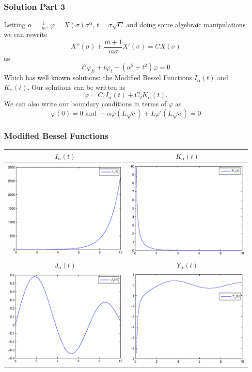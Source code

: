 	
	
	
	\begin{frame}
	\frametitle{Solution Part 3}
		 Letting $\alpha=\frac 1m$, $\varphi=X(\sigma)\sigma ^\alpha$, $t=\sigma \sqrt{C}$ and doing some algebraic manipulations we can rewrite 
		\[X''(\sigma)+\frac{m+1}{m\sigma}X'(\sigma)=C X(\sigma)\]
		as
		\[t^2 \varphi_{tt}+t \varphi_t-(\alpha^2+t^2)\varphi=0\]
		Which has well known solutions: the Modified Bessel Functions $I_\alpha(t)$ and $K_\alpha(t)$. Our solutions can be written as $$\varphi=C_1I_\alpha(t)+C_2K_\alpha(t).$$ We can also write our boundary conditions in terms of $\varphi$ as 
		\[\varphi(0)=0\text{ and }-\alpha\varphi(L\sqrt{c})+L\varphi'(L\sqrt{c})=0\]
	\end{frame}
	
	
	\begin{frame}
		\frametitle{Modified Bessel Functions}
		\centering
		\begin{tabular}{|c|c|}\hline
		$I_\alpha(t)$&$K_\alpha(t)$\\\hline
		\includegraphics[width=.40\textwidth]{Bessel/BesselI.eps}&\includegraphics[width=.40\textwidth]{Bessel/BesselK.eps}\\\hline
		$J_\alpha(t)$&$Y_\alpha(t)$\\\hline
		\includegraphics[width=.40\textwidth]{Bessel/BesselJ.eps}&\includegraphics[width=.40\textwidth]{Bessel/BesselY.eps}\\\hline

\end{tabular}
\end{frame}
